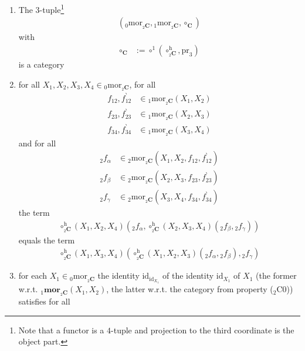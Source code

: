 \begin{enumerate}
\item[(${}_{2}$C0)]
The $3$-tuple\footnote{Note that a functor is a $4$-tuple and projection to the third coordinate is the object part.}
\begin{align*}
  \left(
    {}_{0}\mathrm{mor}_{{}_{2}\mathbf{C}},
    {}_{1}\mathrm{mor}_{{}_{2}\mathbf{C}},
    \circ_{\mathbf{C}}
  \right)
\end{align*}
with
\begin{align*}
  \circ_{\mathbf{C}}
  &:=
  \circ^{1}
  \left(
    \circ_{{}_{2}\mathbf{C}}^{\textrm{h}},
    \mathrm{pr}_{3}
  \right)
\end{align*}
is a category
\item[(${}_{2}$C1)]
for all $X_{1},X_{2},X_{3},X_{4} \in {}_{0}\mathrm{mor}_{{}_{2}\mathbf{C}}$, for all
\begin{align*}
  f_{12},f_{12}^{\backprime}
  &\in
  {}_{1}\mathrm{mor}_{{}_{2}\mathbf{C}}(X_{1},X_{2})
  \\
  f_{23},f_{23}^{\backprime}
  &\in
  {}_{1}\mathrm{mor}_{{}_{2}\mathbf{C}}(X_{2},X_{3})
  \\
  f_{34},f_{34}^{\backprime}
  &\in
  {}_{1}\mathrm{mor}_{{}_{2}\mathbf{C}}(X_{3},X_{4})
\end{align*}
and for all
\begin{align*}
  {}_{2}f_{\alpha}
  &\in
  {}_{2}\mathrm{mor}_{{}_{2}\mathbf{C}}(X_{1},X_{2},f_{12},f_{12}^{\backprime})
  \\
  {}_{2}f_{\beta}
  &\in
  {}_{2}\mathrm{mor}_{{}_{2}\mathbf{C}}(X_{2},X_{3},f_{23},f_{23}^{\backprime})
  \\
  {}_{2}f_{\gamma}
  &\in
  {}_{2}\mathrm{mor}_{{}_{2}\mathbf{C}}(X_{3},X_{4},f_{34},f_{34}^{\backprime})
\end{align*}
the term
\begin{align*}
  \circ_{{}_{2}\mathbf{C}}^{\textrm{h}}
  (X_{1},X_{2},X_{4})
  \left(
    {}_{2}f_{\alpha},
    \circ_{{}_{2}\mathbf{C}}^{\textrm{h}}
    (X_{2},X_{3},X_{4})
    ({}_{2}f_{\beta},{}_{2}f_{\gamma})
  \right)
\end{align*}
equals the term
\begin{align*}
  \circ_{{}_{2}\mathbf{C}}^{\textrm{h}}
  (X_{1},X_{3},X_{4})
  \left(
    \circ_{{}_{2}\mathbf{C}}^{\textrm{h}}
    (X_{1},X_{2},X_{3})
    ({}_{2}f_{\alpha},{}_{2}f_{\beta}),
    {}_{2}f_{\gamma}
  \right)
\end{align*}
\item[(${}_{2}$C2)]
for each $X_{1} \in {}_{0}\mathrm{mor}_{{}_{2}\mathbf{C}}$ the identity $\mathrm{id}_{\mathrm{id}_{X_{1}}}$ of the identity $\mathrm{id}_{X_{1}}$ of $X_{1}$ (the former w.r.t. ${}_{1}\mathbf{mor}_{{}_{2}\mathbf{C}}(X_{1},X_{2})$, the latter w.r.t. the category from property (${}_{2}$C0)) satisfies for all

\end{enumerate}
